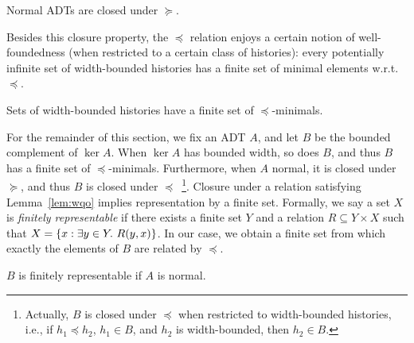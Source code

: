 \begin{lemma}\label{lem:ADT_closure}

  Normal ADTs are closed under $\succeq$.

\end{lemma}

Besides this closure property, the $\preceq$ relation enjoys a certain notion
of well-foundedness (when restricted to a certain class of histories): every potentially 
infinite set of width-bounded histories has a finite set of minimal elements w.r.t. $\preceq$.

\begin{lemma}\label{lem:wqo}

  Sets of width-bounded histories have a finite set of $\preceq$-minimals.

\end{lemma}

For the remainder of this section, we fix an ADT $A$, and let $B$ be the bounded
complement of $\ker A$. When $\ker A$ has bounded width, so does $B$, and thus
$B$ has a finite set of $\preceq$-minimals. 
Furthermore, when $A$ normal, it is closed under
$\succeq$, and thus $B$ is closed under 
$\preceq$~\footnote{Actually, $B$ is closed under $\preceq$ when restricted to width-bounded histories, i.e., if $h_1 \preceq h_2$, $h_1 \in B$, and $h_2$ is width-bounded, then $h_2\in B$.}.
Closure under a relation satisfying Lemma~\ref{lem:wqo} implies
representation by a finite set. Formally, we say a set $X$ is \emph{finitely
representable} if there exists a finite set $Y$ and a relation $R \subseteq Y
\times X$ such that $X = {\{{ x : \exists y\in Y.\ R(y,x) }\}}$. In our case, we
obtain a finite set from which exactly the elements of $B$ are related by
$\preceq$.

\begin{lemma}

  $B$ is finitely representable if $A$ is normal.

\end{lemma}

